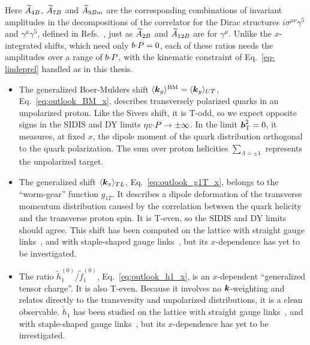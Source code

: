 \endgroup
Here $\widetilde{A}_{4B}$, $\widetilde{A}_{7B}$ and $\widetilde{A}_{9Bm}$ are the corresponding combinations of invariant amplitudes in the decompositions of the correlator for the Dirac structures $i\sigma^{\mu\nu}\gamma^5$ and $\gamma^\mu\gamma^5$, defined in Refs.~\cite{Musch:2011er, Musch:2010ka}, just as $\widetilde{A}_{2B}$ and $\widetilde{A}_{12B}$ are for $\gamma^\mu$. Unlike the $x$-integrated shifts, which need only $b{\cdot} P=0$, each of these ratios needs the amplitudes over a range of $b{\cdot} P$, with the kinematic constraint of Eq.~\eqref{eq-lindeprel} handled as in this thesis.

\begin{itemize}
	\item The generalized Boer-Mulders shift $\langle \boldsymbol{k}_y \rangle^{\text{BM}}=\langle \boldsymbol{k}_y \rangle_{UT}$, Eq.~\eqref{eq:outlook_BM_x}, describes transversely polarized quarks in an unpolarized proton. Like the Sivers shift, it is T-odd, so we expect opposite signs in the SIDIS and DY limits $\eta v {\cdot} P \rightarrow \pm\infty$. In the limit $\boldsymbol{b}_{\mathrm T}^2 = 0$, it measures, at fixed $x$, the dipole moment of the quark distribution orthogonal to the quark polarization. The sum over proton helicities $\sum_{\Lambda=\pm 1}$ represents the unpolarized target.
	\item The generalized shift $\langle \boldsymbol{k}_x \rangle_{TL}$, Eq.~\eqref{eq:outlook_g1T_x}, belongs to the ``worm-gear'' function $g_{1T}$. It describes a dipole deformation of the transverse momentum distribution caused by the correlation between the quark helicity and the transverse proton spin. It is T-even, so the SIDIS and DY limits should agree. This shift has been computed on the lattice with straight gauge links~\cite{MuschThesis2,Hagler:2009mb,Musch:2010ka}, and with staple-shaped gauge links~\cite{Musch:2011er, Yoon:2017qzo}, but its $x$-dependence has yet to be investigated.
	\item The ratio $\tilde h_{1}^{(0)}/\tilde f_1^{(0)}$, Eq.~\eqref{eq:outlook_h1_x}, is an $x$-dependent ``generalized tensor charge''. It is also T-even. Because it involves no $\boldsymbol{k}$-weighting and relates directly to the transversity and unpolarized distributions, it is a clean observable. $\tilde h_{1}$ has been studied on the lattice with straight gauge links~\cite{MuschThesis2,Hagler:2009mb,Musch:2010ka}, and with staple-shaped gauge links~\cite{Musch:2011er, Yoon:2017qzo}, but its $x$-dependence has yet to be investigated.
\end{itemize}
